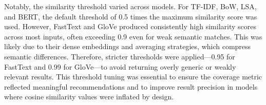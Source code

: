 \documentclass{llncs}
\begin{document}
%
Notably, the similarity threshold varied across models. For TF-IDF, BoW, LSA, and BERT, the default threshold of 0.5 times the maximum similarity score was used. However, FastText and GloVe produced consistently high similarity scores across most inputs, often exceeding 0.9 even for weak semantic matches. This was likely due to their dense embeddings and averaging strategies, which compress semantic differences. Therefore, stricter thresholds were applied—0.95 for FastText and 0.99 for GloVe—to avoid returning overly generic or weakly relevant results. This threshold tuning was essential to ensure the coverage metric reflected meaningful recommendations and to improve result precision in models where cosine similarity values were inflated by design.








%
%
\end{document}
